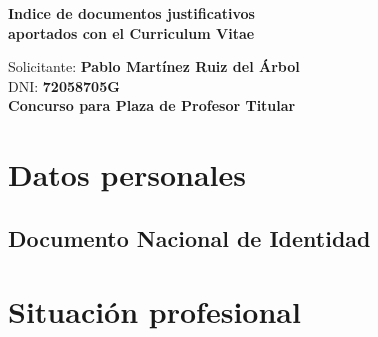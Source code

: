 \documentclass[a4paper, 11pt, twoside, openright]{report}
\begin{document}

\begin{titlepage}

	\vspace*{5.5cm}
	\centering

	{\huge\bfseries Indice de documentos justificativos \\ \vspace*{1cm}
	                aportados con el Curriculum Vitae}
	
	\begin{flushleft}
	
	\vspace{4.6cm}
	{\Large Solicitante: \textbf{Pablo Martínez Ruiz del Árbol}\\}
	\vspace{1.0cm}
	{\Large DNI: \textbf{72058705G}\\}
	\vspace{1.0cm}
	{\Large \textbf{Concurso para Plaza de Profesor Titular}}
	\vfill
	
	\end{flushleft}

\end{titlepage}

\tableofcontents
\clearpage
\thispagestyle{empty}
\phantom{a}
\vfill
\newpage


\setcounter{page}{1}

\renewcommand\thechapter{\arabic{chapter}}
\renewcommand\thesection{\thechapter.\Alph{section}}
\renewcommand\thesubsection{\thesection.\arabic{subsection}}
\renewcommand\thesubsubsection{\thesubsection.\arabic{subsubsection}}


\chapter{Datos personales}
\section{Documento Nacional de Identidad}



\chapter{Situación profesional}
\end{document}

